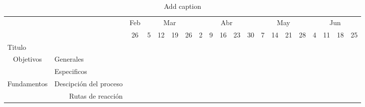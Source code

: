 \begin{table}[htbp]
    \centering
    \caption{Add caption}
    \begin{turn}{90}
      \begin{tabular}{lr|rrrrrrrrrrrrrrrrrr}
      \toprule
            &       & \multicolumn{1}{l}{Feb} & \multicolumn{4}{c}{Mar}       & \multicolumn{5}{c}{Abr}               & \multicolumn{4}{c}{May}       & \multicolumn{4}{c}{Jun} \\
  \cmidrule{3-20}          &       & \multicolumn{1}{c}{26} & \multicolumn{1}{c}{5} & \multicolumn{1}{c}{12} & \multicolumn{1}{c}{19} & \multicolumn{1}{c}{26} & \multicolumn{1}{c}{2} & \multicolumn{1}{c}{9} & \multicolumn{1}{c}{16} & \multicolumn{1}{c}{23} & \multicolumn{1}{c}{30} & \multicolumn{1}{c}{7} & \multicolumn{1}{c}{14} & \multicolumn{1}{c}{21} & \multicolumn{1}{c}{28} & \multicolumn{1}{c}{4} & \multicolumn{1}{c}{11} & \multicolumn{1}{c}{18} & \multicolumn{1}{c}{25} \\
      \midrule
      Titulo &       & \cellcolor[rgb]{ .776,  .937,  .808}\textcolor[rgb]{ 0,  .38,  0}{} & \cellcolor[rgb]{ .776,  .937,  .808}\textcolor[rgb]{ 0,  .38,  0}{} &       &       &       &       &       &       &       &       &       &       &       &       &       &       &       &  \\
      \midrule
      \multicolumn{1}{c}{\multirow{2}[4]{*}{Objetivos}} & \multicolumn{1}{l|}{Generales} &       & \cellcolor[rgb]{ .776,  .937,  .808}\textcolor[rgb]{ 0,  .38,  0}{} &       &       &       &       &       &       &       &       &       &       &       &       &       &       &       &  \\
  \cmidrule{2-20}          & \multicolumn{1}{l|}{Especificos} &       & \cellcolor[rgb]{ .776,  .937,  .808}\textcolor[rgb]{ 0,  .38,  0}{} &       &       &       &       &       &       &       &       &       &       &       &       &       &       &       &  \\
      \midrule
      \multicolumn{1}{c}{\multirow{4}[8]{*}{Fundamentos}} & \multicolumn{1}{p{6.11em}|}{Descipción del proceso} &       &       & \cellcolor[rgb]{ .776,  .937,  .808}\textcolor[rgb]{ 0,  .38,  0}{} &       &       &       &       &       &       &       &       &       &       &       &       &       &       &  \\
  \cmidrule{2-20}          & \multicolumn{1}{p{6.11em}|}{Rutas de reacción} &       &       &       & \cellcolor[rgb]{ .776,  .937,  .808}\textcolor[rgb]{ 0,  .38,  0}{} &       &       &       &       &       &       &       &       &       &       &       &       &       &  \\

\end{tabular}
\end{turn}
\end{table}
